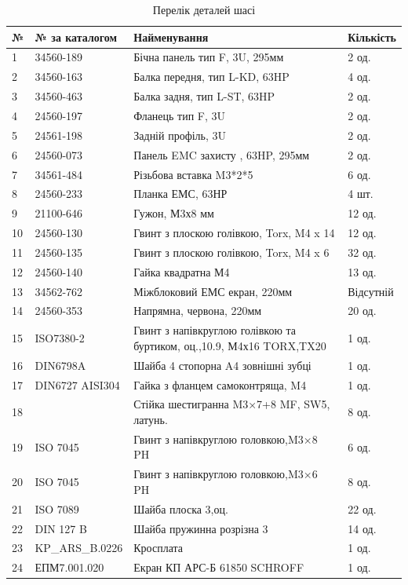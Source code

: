 
\begin{table}[H]
    \centering
  \caption{Перелік деталей шасі}
     \begin{tabular}{|p{0.8cm}|p{3.2cm}|p{7.5cm}|p{2cm}|} 
        \hline
        \textbf{№} & \textbf{№ за каталогом} & \textbf{Найменування} & \textbf{Кількість} \\ \hline
        1 & 34560-189 & Бічна панель тип F, 3U, 295мм  & 2 од. \\ \hline
        2 & 34560-163 & Балка передня, тип L-KD, 63HP & 4 од. \\ \hline
        3 & 34560-463 & Балка задня, тип L-ST, 63HP & 2 од. \\ \hline
        4 & 24560-197 & Фланець тип F, 3U & 2 од. \\ \hline
        5 & 24561-198 & Задній профіль, 3U & 2 од. \\ \hline
        6 & 24560-073 & Панель EMC захисту , 63HP, 295мм & 2 од. \\ \hline
        7 & 34561-484 & Різьбова вставка M3*2*5 & 6 од. \\ \hline
        8 & 24560-233 & Планка ЕМС, 63НР & 4 шт. \\ \hline
        9 & 21100-646 & Гужон, М3х8 мм & 12 од. \\ \hline
       10 & 24560-130 & Гвинт з плоскою голівкою, Torx, M4 x 14 & 12 од. \\ \hline
       11 & 24560-135 & Гвинт з плоскою голівкою, Torx, M4 x 6 & 32 од. \\ \hline
       12 & 24560-140 & Гайка квадратна М4 & 13 од. \\ \hline
       13 & 34562-762 & Міжблоковий ЕМС екран, 220мм & Відсутній \\ \hline
       14 & 24560-353 & Напрямна, червона, 220мм & 20 од. \\ \hline
       15 & ISO7380-2 & Гвинт з напівкруглою голівкою та буртиком, оц.,10.9, М4х16 TORX,TX20 & 1 од. \\ \hline
       16 & DIN6798A & Шайба 4 стопорна A4 зовнішні зубці & 1 од. \\ \hline
       17 & DIN6727 AISI304 & Гайка з фланцем самоконтряща, M4 & 1 од. \\ \hline
       18 &  & Стійка шестигранна M3×7+8 MF, SW5, латунь. & 8 од. \\ \hline
       19 & ISO 7045 & Гвинт з напівкруглою головкою,M3×8 PH & 6 од. \\ \hline
       20 & ISO 7045 & Гвинт з напівкруглою головкою,M3×6 PH & 8 од. \\ \hline
       21 & ISO 7089 & Шайба плоска 3,оц. & 22 од. \\ \hline
       22 & DIN 127 B & Шайба пружинна розрізна 3 & 14 од. \\ \hline
       23 & KP_ARS_B.0226 & Кросплата & 1 од. \\ \hline
       24 & ЕПМ7.001.020 & Екран КП АРС-Б 61850 SCHROFF & 1 од. \\ \hline
   
    \end{tabular}
    
\end{table}


